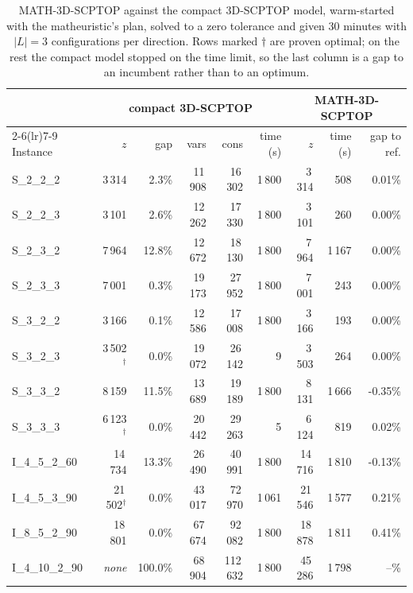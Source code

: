 \begin{table}[!htbp]
\centering
\small
\caption{MATH-3D-SCPTOP against the compact 3D-SCPTOP model, warm-started with the matheuristic's plan, solved to a zero tolerance and given 30 minutes with $|L|=3$ configurations per direction. Rows marked $\dagger$ are proven optimal; on the rest the compact model stopped on the time limit, so the last column is a gap to an incumbent rather than to an optimum.}
\label{tab:exact}
\begin{tabular}{lrrrrrrrr}
\toprule
& \multicolumn{5}{c}{compact 3D-SCPTOP} & \multicolumn{3}{c}{MATH-3D-SCPTOP} \\
\cmidrule(lr){2-6}\cmidrule(lr){7-9}
Instance & $z$ & gap & vars & cons & time (s) & $z$ & time (s) & gap to ref. \\
\midrule
S\_2\_2\_2 & 3\,314 & 2.3\% & 11\,908 & 16\,302 & 1\,800 & 3\,314 & 508 & 0.01\% \\
S\_2\_2\_3 & 3\,101 & 2.6\% & 12\,262 & 17\,330 & 1\,800 & 3\,101 & 260 & 0.00\% \\
S\_2\_3\_2 & 7\,964 & 12.8\% & 12\,672 & 18\,130 & 1\,800 & 7\,964 & 1\,167 & 0.00\% \\
S\_2\_3\_3 & 7\,001 & 0.3\% & 19\,173 & 27\,952 & 1\,800 & 7\,001 & 243 & 0.00\% \\
S\_3\_2\_2 & 3\,166 & 0.1\% & 12\,586 & 17\,008 & 1\,800 & 3\,166 & 193 & 0.00\% \\
S\_3\_2\_3 & 3\,502$^\dagger$ & 0.0\% & 19\,072 & 26\,142 & 9 & 3\,503 & 264 & 0.00\% \\
S\_3\_3\_2 & 8\,159 & 11.5\% & 13\,689 & 19\,189 & 1\,800 & 8\,131 & 1\,666 & -0.35\% \\
S\_3\_3\_3 & 6\,123$^\dagger$ & 0.0\% & 20\,442 & 29\,263 & 5 & 6\,124 & 819 & 0.02\% \\
I\_4\_5\_2\_60 & 14\,734 & 13.3\% & 26\,490 & 40\,991 & 1\,800 & 14\,716 & 1\,810 & -0.13\% \\
I\_4\_5\_3\_90 & 21\,502$^\dagger$ & 0.0\% & 43\,017 & 72\,970 & 1\,061 & 21\,546 & 1\,577 & 0.21\% \\
I\_8\_5\_2\_90 & 18\,801 & 0.0\% & 67\,674 & 92\,082 & 1\,800 & 18\,878 & 1\,811 & 0.41\% \\
I\_4\_10\_2\_90 & \emph{none} & 100.0\% & 68\,904 & 112\,632 & 1\,800 & 45\,286 & 1\,798 & --\% \\
\bottomrule
\end{tabular}
\end{table}

